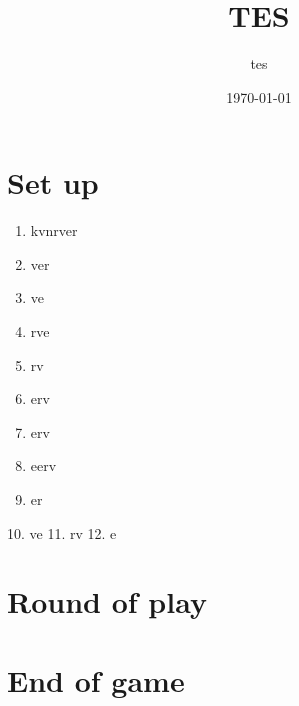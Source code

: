 \documentclass{article}%
\title{TES}%
\author{tes}%
\date{\today}%
\begin{document}
%
\pagestyle{empty}%
\normalsize%
\maketitle%
\section{ Set up
}%
\label{sec:Setup}%
\begin{enumerate}%
\item%
 kvnrver
%
\item%
 ver
%
\item%
 ve
%
\item%
 rve
%
\item%
 rv
%
\item%
 erv
%
\item%
 erv
%
\item%
 eerv
%
\item%
 er
%
\end{enumerate}%
10. ve
%
11. rv
%
12. e


%
\section{ Round of play
}%
\label{sec:Roundofplay}%

%
\section{ End of game}%
\label{sec:Endofgame}%

%
\end{document}
